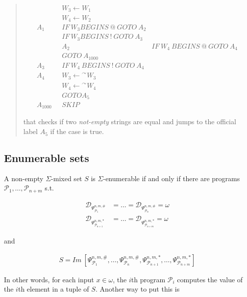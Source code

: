 \documentclass[a4paper, 12pt]{article}
\begin{document}
\begin{quote}
\begin{align*}
    &W_3 \leftarrow W_1  \\ 
    &W_4 \leftarrow W_2 \\ 
    A_1 ~ ~ ~ &IF ~ W_3 BEGINS ~ @ ~ GOTO ~ A_2 \\ 
    &IF ~ W_3 BEGINS ~ ! ~ GOTO ~ A_3 \\ 
    &
    A_2 ~ ~ ~ &IF~ W_4 ~ BEGINS ~ @ ~ GOTO ~ A_4 \\ 
              &GOTO ~ A_{1000}\\
    A_3 ~ ~ ~ &IF~ W_4 ~ BEGINS ~ ! ~ GOTO ~ A_4 \\ 
    A_4 ~ ~ ~ & W_3 \leftarrow {}^{\curvearrowright} W_3 \\ 
              &W_4 \leftarrow {}^{\curvearrowright} W_4 \\ 
              &GOTO A_5 \\ 
    A_{1000}~ ~ ~ & SKIP
\end{align*}

that checks if two \textit{not-empty} strings are equal and jumps to the
official label $A_5$ if the case is true.

\end{quote}
\normalsize


\subsection{Enumerable sets}

A non-empty $\Sigma$-mixed set $S$ is $\Sigma$-enumerable if and only if there are
programs $\mathcal{P}_1, \ldots, \mathcal{P}_{n + m}$ s.t. 

\begin{align*}
    \mathcal{D}_{\Psi_{\mathcal{P}_1}^{n, m, \#}} &= \ldots =
    \mathcal{D}_{\Psi_{\mathcal{P}_n}^{n, m, \#}} = \omega\\
    \mathcal{D}_{\Psi_{\mathcal{P}_{n+1}}^{n, m, *}} &= \ldots =
    \mathcal{D}_{\Psi_{\mathcal{P}_{n+m}}^{n, m, *}} = \omega
\end{align*}

and 

\begin{align*}
    S = Im ~ \left[ \Psi_{\mathcal{P}_1}^{n, m, \#}, \ldots,
    \Psi_{\mathcal{P}_n}^{n, m, \#}, \Psi_{\mathcal{P}_{n+1}}^{n, m, *},
\ldots, \Psi_{\mathcal{P}_{n+m}}^{n, m, *} \right] 
\end{align*}

In other words, for each input $x \in \omega$, the $i$th program $\mathcal{P}_i$
computes the value of the $i$th element in a tuple of $S$. Another way to put
this is 
\end{document}
